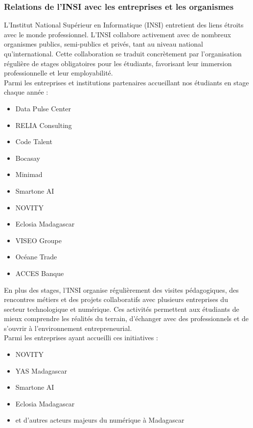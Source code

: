 \documentclass[a4paper,12pt, oneside]{article}
\begin{document}
\subsubsection{Relations de l’INSI avec les entreprises et les organismes} 
L’Institut National Supérieur en Informatique (INSI) entretient des liens étroits avec le monde professionnel. L’INSI collabore activement avec de nombreux organismes publics, semi-publics et privés, tant au niveau national qu’international. Cette collaboration se traduit concrètement par l’organisation régulière de stages obligatoires pour les étudiants, favorisant leur immersion professionnelle et leur employabilité.\\

Parmi les entreprises et institutions partenaires accueillant nos étudiants en stage chaque année :
\begin{itemize}
    \item Data Pulse Center
    \item RELIA Consulting
    \item Code Talent
    \item Bocasay
    \item Minimad
    \item Smartone AI
    \item NOVITY
    \item Eclosia Madagascar
    \item VISEO Groupe
    \item Océane Trade
    \item ACCES Banque
\end{itemize}

En plus des stages, l’INSI organise régulièrement des visites pédagogiques, des rencontres métiers et des projets collaboratifs avec plusieurs entreprises du secteur technologique et numérique. Ces activités permettent aux étudiants de mieux comprendre les réalités du terrain, d’échanger avec des professionnels et de s’ouvrir à l’environnement entrepreneurial.\\

Parmi les entreprises ayant accueilli ces initiatives :
\begin{itemize}
    \item NOVITY
    \item YAS Madagascar
    \item Smartone AI
    \item Eclosia Madagascar
    \item et d'autres acteurs majeurs du numérique à Madagascar
\end{itemize}
\end{document}
